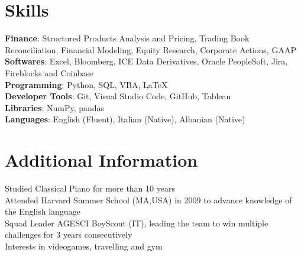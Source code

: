 \documentclass[letterpaper,11pt]{article}
\begin{document}
\section{Skills}
 \begin{itemize}[leftmargin=0.15in, label={}]
    \small{\item{
     \textbf{Finance}{: Structured Products Analysis and Pricing, Trading Book Reconciliation, Financial Modeling, Equity Research, Corporate Actions, GAAP} \\
     \textbf{Softwares}{: Excel, Bloomberg, ICE Data Derivatives, Oracle PeopleSoft, Jira, Fireblocks and Coinbase} \\
     \textbf{Programming}{: Python, SQL, VBA, \LaTeX} \\
     \textbf{Developer Tools}{: Git, Visual Studio Code, GitHub, Tableau} \\
     \textbf{Libraries}{: NumPy, pandas} \\
     \textbf{Languages}{: English (Fluent), Italian (Native), Albanian (Native)}
    }}
 \end{itemize}

\section{Additional Information}
\begin{itemize}[leftmargin=0.15in, label={}]
   \small{\item{
    {Studied Classical Piano for more than 10 years} \\
    {Attended Harvard Summer School (MA,USA) in 2009 to advance knowledge of the English language} \\
    {Squad Leader AGESCI BoyScout (IT), leading the team to win multiple challenges for 3 years consecutively} \\
    {Interests in videogames, travelling and gym}
   }} 
\end{itemize}
\end{document}
